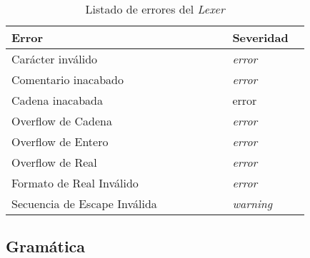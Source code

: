 \documentclass[a4paper]{CSMakotoTechnicalReport}
\begin{document}
\begin{multicols}{2}
    \renewcommand{\arraystretch}{1.35}
    \begin{table}[H]
        \caption{Listado de errores del \textit{Lexer}}
        \begin{tabular}{L{0.63\linewidth} L{0.20\linewidth}}
            \toprule
            \textbf{Error} & \textbf{Severidad} \\
            \midrule
            Carácter inválido & \textit{error} \\
            Comentario inacabado & \textit{error} \\
            Cadena inacabada & error \\
            Overflow de Cadena & \textit{error} \\
            Overflow de Entero & \textit{error} \\
            Overflow de Real & \textit{error} \\
            Formato de Real Inválido & \textit{error} \\
            Secuencia de Escape Inválida & \textit{warning} \\
            \bottomrule
        \end{tabular}
        \label{tab:err-lexer}
    \end{table}
\end{multicols}

    \subsection{Gramática}
\end{document}
